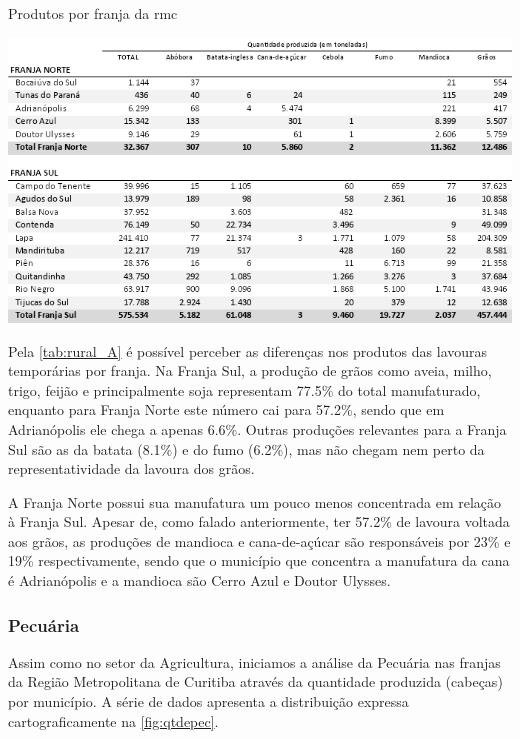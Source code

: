 	\begin{table}
		\centering
		\caption{Produtos por franja da \gls{rmc}}
		\includegraphics[width=1\linewidth]{img/rural_A}
		\label{tab:rural_A}
	\end{table}

	Pela \autoref{tab:rural_A} é possível perceber as diferenças nos produtos das lavouras temporárias por franja. Na Franja Sul, a produção de grãos como aveia, milho, trigo, feijão e principalmente soja representam 77.5\% do total manufaturado, enquanto para Franja Norte este número cai para 57.2\%, sendo que em Adrianópolis ele chega a apenas 6.6\%. Outras produções relevantes para a Franja Sul são as da batata (8.1\%) e do fumo (6.2\%), mas não chegam nem perto da representatividade da lavoura dos grãos.

	A Franja Norte possui sua manufatura um pouco menos concentrada em relação à Franja Sul. Apesar de, como falado anteriormente, ter 57.2\% de lavoura voltada aos grãos, as produções de mandioca e cana-de-açúcar são responsáveis por 23\% e 19\% respectivamente, sendo que o município que concentra a manufatura da cana é Adrianópolis e a mandioca são Cerro Azul e Doutor Ulysses.
	
	\subsubsection{Pecuária}
	
	Assim como no setor da Agricultura, iniciamos a análise da Pecuária nas franjas da Região Metropolitana de Curitiba através da quantidade produzida (cabeças) por município. A série de dados apresenta a distribuição expressa cartograficamente na \autoref{fig:qtdepec}.
	
